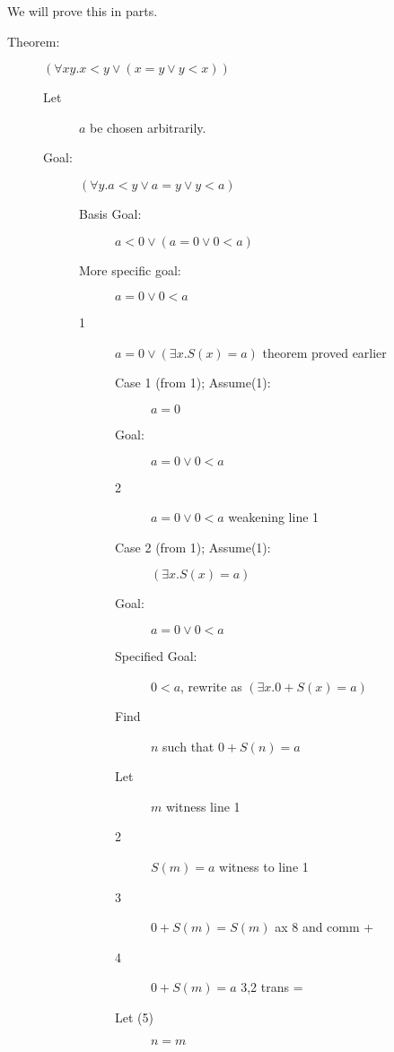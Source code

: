 \documentclass[12pt]{article}
\begin{document}
We will prove this in parts.

\begin{description}

\item[Theorem:]  $(\forall xy.x<y \vee (x=y \vee y<x))$

\begin{description}

\item [Let] $a$ be chosen arbitrarily.

\item[Goal:]  $(\forall y.a<y \vee a=y \vee y<a)$

\begin{description}

\item[Basis Goal:]  $a<0 \vee (a=0 \vee 0<a)$

\item[More specific goal:]  $a=0 \vee 0<a$

\item[1] $a=0 \vee (\exists x.S(x)=a)$  theorem proved earlier

\begin{description}

\item[Case 1 (from 1); Assume(1):]  $a=0$

\item[Goal:]  $a=0 \vee 0<a$

\item[2]  $a=0 \vee 0<a$  weakening line 1

\item[Case 2 (from 1); Assume(1):]  $(\exists x.S(x)=a)$ 

\item[Goal:]  $a=0 \vee 0<a$

\item[Specified Goal:]  $0<a$, rewrite as $(\exists x.0+S(x)=a)$

\item[Find] $n$ such that $0+S(n)=a$

\item[Let] $m$ witness line 1

\item[2] $S(m)=a$  witness to line 1

\item[3] $0+S(m)=S(m)$ ax 8 and comm +

\item[4]  $0+S(m)=a$  3,2 trans =

\item[Let (5)]  $n=m$


\end{description}
\end{description}
\end{description}
\end{description}
\end{document}
